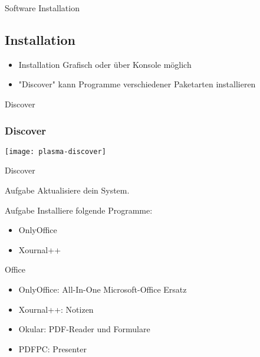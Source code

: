 \begin{frame}{Software Installation}
    \subsection{Installation}\label{subsec:installation}

    \begin{itemize}
        \item Installation Grafisch oder über Konsole möglich\pause
        \item "Discover" kann Programme verschiedener Paketarten installieren
    \end{itemize}

\end{frame}

\begin{frame}{Discover}
    \subsubsection{Discover}\label{subsubsec:discover}

    \texttt{[image: plasma-discover]}
\end{frame}

\begin{frame}{Discover}
    \vspace{0.5cm}
    \begin{alertblock}{Aufgabe}
        Aktualisiere dein System.
    \end{alertblock}
    \pause

    \vspace{0.5cm}
    \begin{alertblock}{Aufgabe}
        Installiere folgende Programme:
        \begin{itemize}
            \item OnlyOffice
            \item Xournal++
        \end{itemize}
    \end{alertblock}

\end{frame}

\begin{frame}{Office}

    \begin{itemize}
        \item OnlyOffice: All-In-One Microsoft-Office Ersatz\pause
        \item Xournal++: Notizen\pause
        \item Okular: PDF-Reader und Formulare\pause
        \item PDFPC: Presenter
    \end{itemize}

\end{frame}

